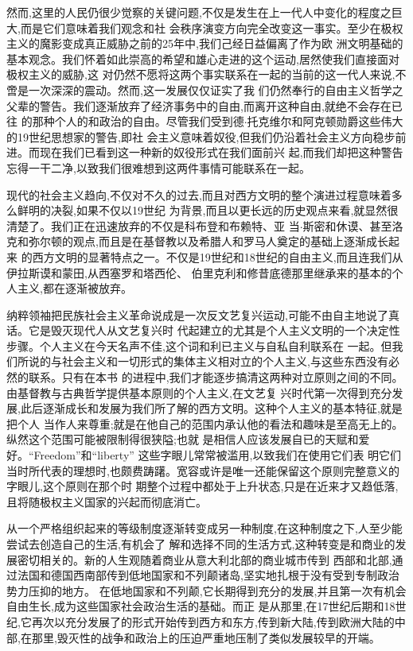 ﻿\documentclass[12pt]{article}
\begin{document}
然而,这里的人民仍很少觉察的关键问题,不仅是发生在上一代人中变化的程度之巨大,而是它们意味着我们观念和社
会秩序演变方向完全改变这一事实。至少在极权主义的魔影变成真正威胁之前的25年中,我们己经日益偏离了作为欧
洲文明基础的基本观念。我们怀着如此崇高的希望和雄心走进的这个运动,居然使我们直接面对极权主义的威胁,这
对仍然不愿将这两个事实联系在一起的当前的这一代人来说,不啻是一次深深的震动。然而,这一发展仅仅证实了我
们仍然奉行的自由主义哲学之父辈的警告。我们逐渐放弃了经济事务中的自由,而离开这种自由,就绝不会存在已往
的那种个人的和政治的自由。尽管我们受到德$\cdot$托克维尔和阿克顿勋爵这些伟大的19世纪思想家的警告,即社
会主义意味着奴役,但我们仍沿着社会主义方向稳步前进。而现在我们已看到这一种新的奴役形式在我们面前兴
起,而我们却把这种警告忘得一干二净,以致我们很难想到这两件事情可能联系在一起。

现代的社会主义趋向,不仅对不久的过去,而且对西方文明的整个演进过程意味着多么鲜明的决裂,如果不仅以19世纪
为背景,而且以更长远的历史观点来看,就显然很清楚了。我们正在迅速放弃的不仅是科布登和布赖特、亚
当$\cdot$斯密和休谟、甚至洛克和弥尔顿的观点,而且是在基督教以及希腊人和罗马人奠定的基础上逐渐成长起来
的西方文明的显著特点之一。不仅是19世纪和18世纪的自由主义,而且连我们从伊拉斯谟和蒙田,从西塞罗和塔西伦、
伯里克利和修昔底德那里继承来的基本的个人主义,都在逐渐被放弃。

纳粹领袖把民族社会主义革命说成是一次反文艺复兴运动,可能不由自主地说了真话。它是毁灭现代人从文艺复兴时
代起建立的尤其是个人主义文明的一个决定性步骤。个人主义在今天名声不佳,这个词和利已主义与自私自利联系在
一起。但我们所说的与社会主义和一切形式的集体主义相对立的个人主义,与这些东西没有必然的联系。只有在本书
的进程中,我们才能逐步搞清这两种对立原则之间的不同。由基督教与古典哲学提供基本原则的个人主义,在文艺复
兴时代第一次得到充分发展,此后逐渐成长和发展为我们所了解的西方文明。这种个人主义的基本特征,就是把个人
当作人来尊重;就是在他自己的范围内承认他的看法和趣味是至高无上的。纵然这个范围可能被限制得很狭隘;也就
是相信人应该发展自已的天赋和爱好。``Freedom''和``liberty'' 这些字眼儿常常被滥用,以致我们在使用它们表
明它们当时所代表的理想时,也颇费踌躇。宽容或许是唯一还能保留这个原则完整意义的字眼儿,这个原则在那个时
期整个过程中都处于上升状态,只是在近来才又趋低落,且将随极权主义国家的兴起而彻底消亡。

从一个严格组织起来的等级制度逐渐转变成另一种制度,在这种制度之下,人至少能尝试去创造自己的生活,有机会了
解和选择不同的生活方式,这种转变是和商业的发展密切相关的。新的人生观随着商业从意大利北部的商业城市传到
西部和北部,通过法国和德国西南部传到低地国家和不列颠诸岛,坚实地扎根于没有受到专制政治势力压抑的地方。
在低地国家和不列颠,它长期得到充分的发展,并且第一次有机会自由生长,成为这些国家社会政治生活的基础。而正
是从那里,在17世纪后期和18世纪,它再次以充分发展了的形式开始传到西方和东方,传到新大陆,传到欧洲大陆的中
部,在那里,毁灭性的战争和政治上的压迫严重地压制了类似发展较早的开端。
\end{document}
